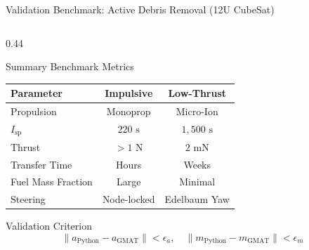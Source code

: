 \documentclass[aspectratio=169, 10pt]{beamer}
\begin{document}
\begin{frame}{Validation Benchmark: Active Debris Removal (12U CubeSat)}
\begin{columns}[T]
        \begin{column}{0.44\textwidth}
            \begin{block}{Summary Benchmark Metrics}
                \scriptsize
                \centering
                \begin{tabular}{lcc}
                    \toprule
                    \textbf{Parameter} & \textbf{Impulsive} & \textbf{Low-Thrust} \\
                    \midrule
                    Propulsion & Monoprop & Micro-Ion \\
                    $I_{\text{sp}}$ & $220\text{ s}$ & $1{,}500\text{ s}$ \\
                    Thrust & $> 1\text{ N}$ & $2\text{ mN}$ \\
                    Transfer Time & Hours & Weeks \\
                    Fuel Mass Fraction & Large & Minimal \\
                    Steering & Node-locked & Edelbaum Yaw \\
                    \bottomrule
                \end{tabular}
            \end{block}
            \vspace{0.1cm}
            \begin{alertblock}{Validation Criterion}
                \scriptsize
                $$\|a_{\text{Python}} - a_{\text{GMAT}}\| < \epsilon_a, \quad \|m_{\text{Python}} - m_{\text{GMAT}}\| < \epsilon_m$$
            \end{alertblock}
        \end{column}
    \end{columns}
\end{frame}
\end{document}
